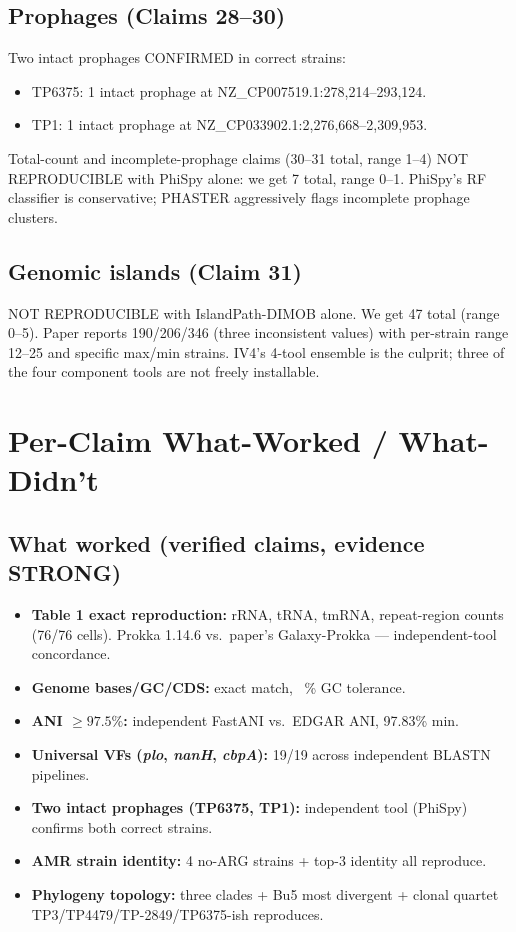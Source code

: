\documentclass[11pt,a4paper]{article}
\begin{document}
\subsection{Prophages (Claims 28--30)}
Two intact prophages CONFIRMED in correct strains:
\begin{itemize}
\item TP6375: 1 intact prophage at NZ\_CP007519.1:278{,}214--293{,}124.
\item TP1: 1 intact prophage at NZ\_CP033902.1:2{,}276{,}668--2{,}309{,}953.
\end{itemize}
Total-count and incomplete-prophage claims (30--31 total, range 1--4) NOT REPRODUCIBLE with PhiSpy alone: we get 7 total, range 0--1. PhiSpy's RF classifier is conservative; PHASTER aggressively flags incomplete prophage clusters.

\subsection{Genomic islands (Claim 31)}
NOT REPRODUCIBLE with IslandPath-DIMOB alone. We get 47 total (range 0--5). Paper reports 190/206/346 (three inconsistent values) with per-strain range 12--25 and specific max/min strains. IV4's 4-tool ensemble is the culprit; three of the four component tools are not freely installable.

\section{Per-Claim What-Worked / What-Didn't}

\subsection{What worked (verified claims, evidence STRONG)}
\begin{itemize}
\item \textbf{Table 1 exact reproduction:} rRNA, tRNA, tmRNA, repeat-region counts (76/76 cells). Prokka 1.14.6 vs.\ paper's Galaxy-Prokka --- independent-tool concordance.
\item \textbf{Genome bases/GC/CDS:} exact match, ~\% GC tolerance.
\item \textbf{ANI $\geq 97.5\%$:} independent FastANI vs.\ EDGAR ANI, 97.83\% min.
\item \textbf{Universal VFs (\emph{plo}, \emph{nanH}, \emph{cbpA}):} 19/19 across independent BLASTN pipelines.
\item \textbf{Two intact prophages (TP6375, TP1):} independent tool (PhiSpy) confirms both correct strains.
\item \textbf{AMR strain identity:} 4 no-ARG strains + top-3 identity all reproduce.
\item \textbf{Phylogeny topology:} three clades + Bu5 most divergent + clonal quartet TP3/TP4479/TP-2849/TP6375-ish reproduces.
\end{itemize}
\end{document}
